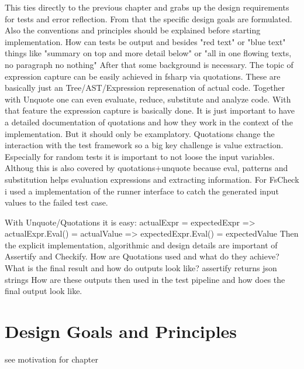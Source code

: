 \documentclass[
	bibliography=totoc,
	listof=totoc,
]{scrbook}
\begin{document}
\begin{justify}
This ties directly to the previous chapter and grabs up the design requirements for tests and error reflection.
From that the specific design goals are formulated.
Also the conventions and principles should be explained before starting implementation.
How can tests be output and besides "red text" or "blue text" things like "summary on top and more detail below" or "all in one flowing texts, no paragraph no nothing"
After that some background is necessary. The topic of expression capture can be easily achieved in fsharp via quotations.
These are basically just an Tree/AST/Expression represenation of actual code.
Together with Unquote one can even evaluate, reduce, substitute and analyze code.
With that feature the expression capture is basically done. It is just important to have a detailed documentation of quotations and how they work in the context of the implementation.
But it should only be examplatory.
Quotations change the interaction with the test framework so a big key challenge is value extraction.
Especially for random tests it is important to not loose the input variables.
Althoug this is also covered by quotations+unquote because eval, patterns and substitution helps evaluation expressions and extracting information.
For FsCheck i used a implementation of the runner interface to catch the generated input values to the failed test case.

With Unquote/Quotations it is easy:
actualExpr = expectedExpr
=> actualExpr.Eval() = actualValue
=> expectedExpr.Eval() = expectedValue
Then the explicit implementation, algorithmic and design details are important of Assertify and Checkify. How are Quotations used and what do they achieve?
What is the final result and how do outputs look like? assertify returns json strings
How are these outputs then used in the test pipeline and how does the final output look like.
\end{justify}


\section{Design Goals and Principles} %


\begin{marker}\begin{justify}
see motivation for chapter
\end{justify}\end{marker}
\end{document}
